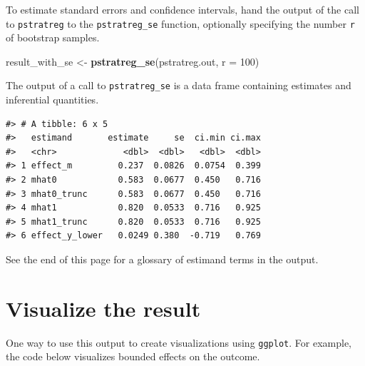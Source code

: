 \documentclass[
]{book}
\newenvironment{Shaded}{\begin{snugshade}}{\end{snugshade}}
\newcommand{\AttributeTok}[1]{\textcolor[rgb]{0.13,0.29,0.53}{#1}}
\newcommand{\DecValTok}[1]{\textcolor[rgb]{0.00,0.00,0.81}{#1}}
\newcommand{\FunctionTok}[1]{\textcolor[rgb]{0.13,0.29,0.53}{\textbf{#1}}}
\newcommand{\NormalTok}[1]{#1}
\newcommand{\OtherTok}[1]{\textcolor[rgb]{0.56,0.35,0.01}{#1}}
\begin{document}
To estimate standard errors and confidence intervals, hand the output of the call to \texttt{pstratreg} to the \texttt{pstratreg\_se} function, optionally specifying the number \texttt{r} of bootstrap samples.

\begin{Shaded}
\begin{Highlighting}[]
\NormalTok{result\_with\_se }\OtherTok{\textless{}{-}} \FunctionTok{pstratreg\_se}\NormalTok{(pstratreg.out, }\AttributeTok{r =} \DecValTok{100}\NormalTok{)}
\end{Highlighting}
\end{Shaded}

The output of a call to \texttt{pstratreg\_se} is a data frame containing estimates and inferential quantities.

\begin{verbatim}
#> # A tibble: 6 x 5
#>   estimand       estimate     se  ci.min ci.max
#>   <chr>             <dbl>  <dbl>   <dbl>  <dbl>
#> 1 effect_m         0.237  0.0826  0.0754  0.399
#> 2 mhat0            0.583  0.0677  0.450   0.716
#> 3 mhat0_trunc      0.583  0.0677  0.450   0.716
#> 4 mhat1            0.820  0.0533  0.716   0.925
#> 5 mhat1_trunc      0.820  0.0533  0.716   0.925
#> 6 effect_y_lower   0.0249 0.380  -0.719   0.769
\end{verbatim}

See the end of this page for a glossary of estimand terms in the output.

\hypertarget{visualize-the-result}{%
\section{Visualize the result}\label{visualize-the-result}}

One way to use this output to create visualizations using \texttt{ggplot}. For example, the code below visualizes bounded effects on the outcome.
\end{document}
